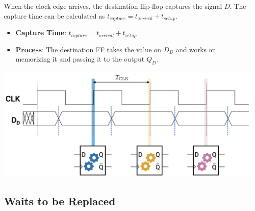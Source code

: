 \documentclass[12pt,openany]{book}
\begin{document}
\begin{minipage}{0.55\textwidth}
    When the clock edge arrives, the destination flip-flop captures the signal $D$. The capture time can be calculated as $t_{capture} = t_{arrival} + t_{setup}$.

    \begin{itemize}
        \item[] \textbf{Capture Time}: $t_{capture} = t_{arrival} + t_{setup}$
        \item[] \textbf{Process}: The destination FF takes the value on $D_D$ and works on memorizing it and passing it to the output $Q_D$.
    \end{itemize}
\end{minipage}
\hfill
\vline
\hfill
\begin{minipage}{0.4\textwidth}
    \centering
    \includegraphics[width=1.3\textwidth]{circuits/15.4.5.png}
\end{minipage}
\vspace*{20px}

\subsection{Waits to be Replaced}
\end{document}
